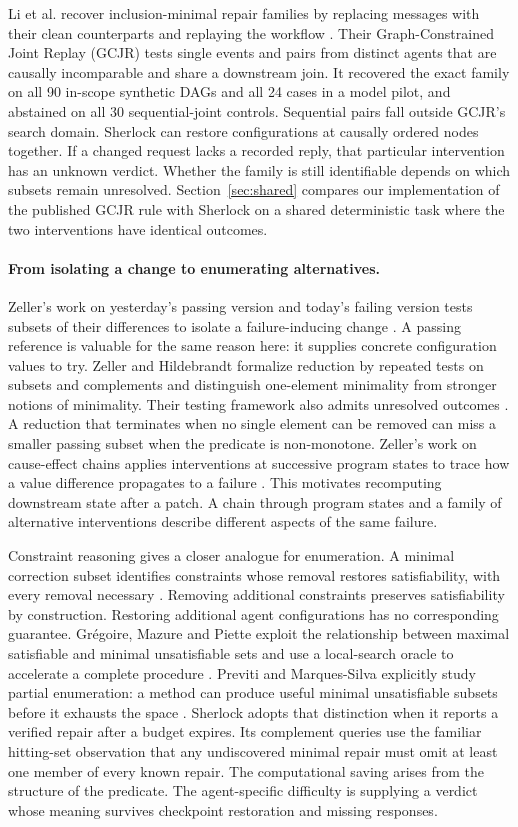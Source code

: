 \documentclass[11pt,letterpaper]{article}
\begin{document}
Li et al. recover inclusion-minimal repair families by replacing messages with their clean counterparts and replaying the workflow \cite{li}. Their Graph-Constrained Joint Replay (GCJR) tests single events and pairs from distinct agents that are causally incomparable and share a downstream join. It recovered the exact family on all 90 in-scope synthetic DAGs and all 24 cases in a model pilot, and abstained on all 30 sequential-joint controls. Sequential pairs fall outside GCJR's search domain. Sherlock can restore configurations at causally ordered nodes together. If a changed request lacks a recorded reply, that particular intervention has an unknown verdict. Whether the family is still identifiable depends on which subsets remain unresolved. Section~\ref{sec:shared} compares our implementation of the published GCJR rule with Sherlock on a shared deterministic task where the two interventions have identical outcomes.

\paragraph{From isolating a change to enumerating alternatives.}
Zeller's work on yesterday's passing version and today's failing version tests subsets of their differences to isolate a failure-inducing change \cite{yesterday}. A passing reference is valuable for the same reason here: it supplies concrete configuration values to try. Zeller and Hildebrandt formalize reduction by repeated tests on subsets and complements and distinguish one-element minimality from stronger notions of minimality. Their testing framework also admits unresolved outcomes \cite{zeller}. A reduction that terminates when no single element can be removed can miss a smaller passing subset when the predicate is non-monotone. Zeller's work on cause-effect chains applies interventions at successive program states to trace how a value difference propagates to a failure \cite{chains}. This motivates recomputing downstream state after a patch. A chain through program states and a family of alternative interventions describe different aspects of the same failure.

Constraint reasoning gives a closer analogue for enumeration. A minimal correction subset identifies constraints whose removal restores satisfiability, with every removal necessary \cite{mcs}. Removing additional constraints preserves satisfiability by construction. Restoring additional agent configurations has no corresponding guarantee. Grégoire, Mazure and Piette exploit the relationship between maximal satisfiable and minimal unsatisfiable sets and use a local-search oracle to accelerate a complete procedure \cite{boost}. Previti and Marques-Silva explicitly study partial enumeration: a method can produce useful minimal unsatisfiable subsets before it exhausts the space \cite{previti}. Sherlock adopts that distinction when it reports a verified repair after a budget expires. Its complement queries use the familiar hitting-set observation that any undiscovered minimal repair must omit at least one member of every known repair. The computational saving arises from the structure of the predicate. The agent-specific difficulty is supplying a verdict whose meaning survives checkpoint restoration and missing responses.
\end{document}
